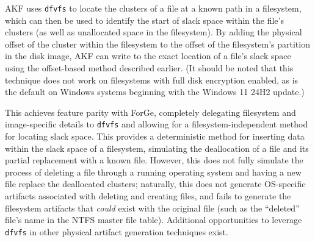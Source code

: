 AKF uses \passthrough{\lstinline!dfvfs!} to locate the clusters of a
file at a known path in a filesystem, which can then be used to identify
the start of slack space within the file's clusters (as well as
unallocated space in the filesystem). By adding the physical offset of
the cluster within the filesystem to the offset of the filesystem's
partition in the disk image, AKF can write to the exact location of a
file's slack space using the offset-based method described earlier. (It
should be noted that this technique does not work on filesystems with
full disk encryption enabled, as is the default on Windows systems
beginning with the Windows 11 24H2 update.)

This achieves feature parity with ForGe, completely delegating
filesystem and image-specific details to \passthrough{\lstinline!dfvfs!}
and allowing for a filesystem-independent method for locating slack
space. This provides a deterministic method for inserting data within
the slack space of a filesystem, simulating the deallocation of a file
and its partial replacement with a known file. However, this does not
fully simulate the process of deleting a file through a running
operating system and having a new file replace the deallocated clusters;
naturally, this does not generate OS-specific artifacts associated with
deleting and creating files, and fails to generate the filesystem
artifacts that \emph{could} exist with the original file (such as the
``deleted'' file's name in the NTFS master file table). Additional
opportunities to leverage \passthrough{\lstinline!dfvfs!} in other
physical artifact generation techniques exist.
